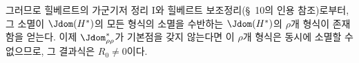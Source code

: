 
그러므로 힐베르트의 가군기저 정리 I와 힐베르트 보조정리(\S\ 10의 인용 참조)로부터, 그 소멸이 $\Jdom(H^*)$의 모든 형식의 소멸을 수반하는 $\Jdom(H^*)$의 $\rho$개 형식이 존재함을 얻는다. 이제 $\Jdom^*_{\rho\rho}$가 기본점을 갖지 않는다면 이 $\rho$개 형식은 동시에 소멸할 수 없으므로, 그 결과식은 $R_0\ne0$이다.
